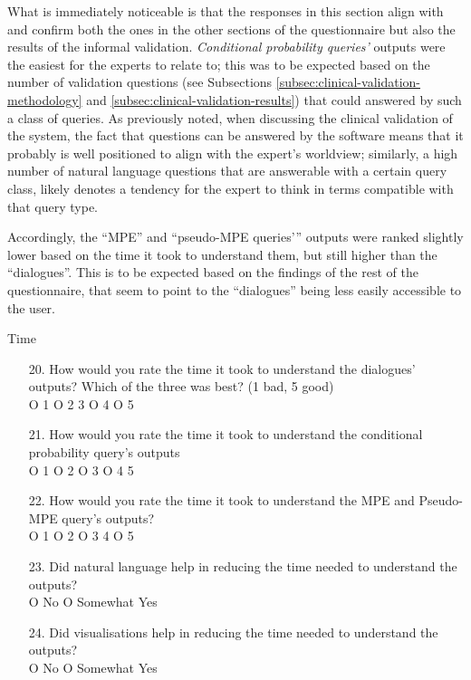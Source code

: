 What is immediately noticeable is that the responses in this section align with and confirm both the ones in the other sections of the  questionnaire but also the results of the informal validation.
\textit{Conditional probability queries'} outputs were the easiest for the experts to relate to; this was to be expected based on the number of validation questions (see Subsections \ref{subsec:clinical-validation-methodology} and \ref{subsec:clinical-validation-results}) that could answered by such a class of queries.
As previously noted, when discussing the clinical validation of the system, the fact that questions can be answered by the software means that it probably is well positioned to align with the expert's worldview; similarly, a high number of natural language questions that are answerable with a certain query class, likely denotes a tendency for the expert to think in terms compatible with that query type.

Accordingly, the \enquote{MPE} and \enquote{pseudo-MPE queries'} outputs were ranked slightly lower based on the time it took to understand them, but still higher than the \enquote{dialogues}.
This is to be expected based on the findings of the rest of the questionnaire, that seem to point to the \enquote{dialogues} being less easily accessible to the user.

\begin{framed}
		{\Large Time}
	\begin{enumerate}[resume]
		\item[20.] How would you rate the time it took to understand the dialogues' outputs?  Which of the three was best? (1 bad, 5 good) \\
		O 1 O 2  3 O 4 O 5
		\item[21.] How would you rate the time it took to understand the conditional probability query's outputs \\
		O 1 O 2 O 3 O 4  5
		\item[22.] How would you rate the time it took to understand the MPE and Pseudo-MPE query's outputs? \\
		O 1 O 2 O 3  4 O 5
		\item[23.] Did natural language help in reducing the time needed to understand the outputs? \\
		O No O Somewhat  Yes
		\item[24.] Did visualisations help in reducing the time needed to understand the outputs? \\
		O No O Somewhat  Yes
	\end{enumerate}
	\label{ques:time}
\end{framed}

